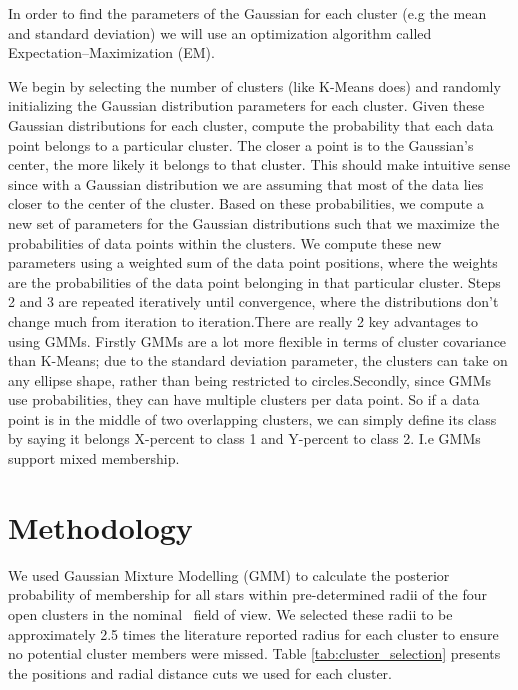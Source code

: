In order to find the parameters of the Gaussian for each cluster (e.g the mean and standard deviation) we will use an optimization algorithm called Expectation–Maximization (EM).

We begin by selecting the number of clusters (like K-Means does) and randomly initializing the Gaussian distribution parameters for each cluster.
Given these Gaussian distributions for each cluster, compute the probability that each data point belongs to a particular cluster. The closer a point is to the Gaussian’s center, the more likely it belongs to that cluster. This should make intuitive sense since with a Gaussian distribution we are assuming that most of the data lies closer to the center of the cluster.
Based on these probabilities, we compute a new set of parameters for the Gaussian distributions such that we maximize the probabilities of data points within the clusters. We compute these new parameters using a weighted sum of the data point positions, where the weights are the probabilities of the data point belonging in that particular cluster.
Steps 2 and 3 are repeated iteratively until convergence, where the distributions don’t change much from iteration to iteration.There are really 2 key advantages to using GMMs. Firstly GMMs are a lot more flexible in terms of cluster covariance than K-Means; due to the standard deviation parameter, the clusters can take on any ellipse shape, rather than being restricted to circles.Secondly, since GMMs use probabilities, they can have multiple clusters per data point. So if a data point is in the middle of two overlapping clusters, we can simply define its class by saying it belongs X-percent to class 1 and Y-percent to class 2. I.e GMMs support mixed membership.



\section{Methodology}

We used Gaussian Mixture Modelling (GMM) to calculate the posterior probability of membership for all stars within pre-determined radii of the four open clusters in the nominal \Kepler~field of view. We selected these radii to be approximately 2.5 times the literature reported radius for each cluster to ensure no potential cluster members were missed. Table \ref{tab:cluster_selection} presents the positions and radial distance cuts we used for each cluster. 

